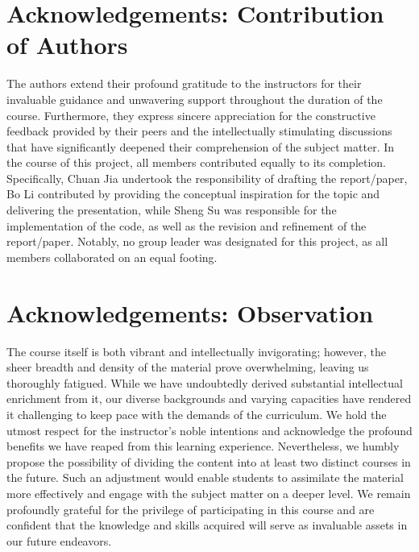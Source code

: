\documentclass[12pt]{article}
\begin{document}
\section*{Acknowledgements: Contribution of Authors}
The authors extend their profound gratitude to the instructors for their invaluable guidance and unwavering support throughout the duration of the course. Furthermore, they express sincere appreciation for the constructive feedback provided by their peers and the intellectually stimulating discussions that have significantly deepened their comprehension of the subject matter. In the course of this project, all members contributed equally to its completion. Specifically, Chuan Jia undertook the responsibility of drafting the report/paper, Bo Li contributed by providing the conceptual inspiration for the topic and delivering the presentation, while Sheng Su was responsible for the implementation of the code, as well as the revision and refinement of the report/paper. Notably, no group leader was designated for this project, as all members collaborated on an equal footing.

\section*{Acknowledgements: Observation}
The course itself is both vibrant and intellectually invigorating; however, the sheer breadth and density of the material prove overwhelming, leaving us thoroughly fatigued. While we have undoubtedly derived substantial intellectual enrichment from it, our diverse backgrounds and varying capacities have rendered it challenging to keep pace with the demands of the curriculum. We hold the utmost respect for the instructor's noble intentions and acknowledge the profound benefits we have reaped from this learning experience. Nevertheless, we humbly propose the possibility of dividing the content into at least two distinct courses in the future. Such an adjustment would enable students to assimilate the material more effectively and engage with the subject matter on a deeper level. We remain profoundly grateful for the privilege of participating in this course and are confident that the knowledge and skills acquired will serve as invaluable assets in our future endeavors.
\end{document}

